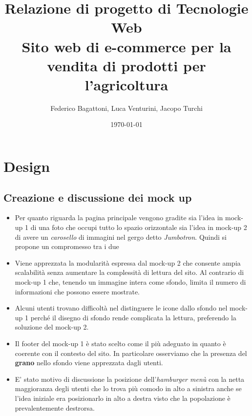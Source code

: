 \documentclass{report}
\title{
    Relazione di progetto di Tecnologie Web\\
    \large Sito web di e-commerce per la vendita di prodotti per l'agricoltura
}
\author{Federico Bagattoni, Luca Venturini, Jacopo Turchi}
\date{\today}
\begin{document}
\maketitle

\tableofcontents

\chapter{Design}

\section{Creazione e discussione dei mock up}
\begin{itemize}
    \item {Per quanto riguarda la pagina principale vengono gradite sia l'idea in mock-up 1 di una foto che occupi tutto lo spazio orizzontale sia l'idea in mock-up 2 di avere un \textit{carosello} di immagini nel gergo detto \textit{Jumbotron}. Quindi si propone un compromesso tra i due}
    \item {Viene apprezzata la modularità espressa dal mock-up 2 che consente ampia scalabilità senza aumentare la complessità di lettura del sito. Al contrario di mock-up 1 che, tenendo un immagine intera come sfondo, limita il numero di informazioni che possono essere mostrate.}
    \item {Alcuni utenti trovano difficoltà nel distinguere le icone dallo sfondo nel mock-up 1 perché il disegno di sfondo rende complicata la lettura, preferendo la soluzione del mock-up 2.}
    \item {Il footer del mock-up 1 è stato scelto come il più adeguato in quanto è coerente con il contesto del sito. In particolare osserviamo che la presenza del \textbf{grano} nello sfondo viene apprezzata dagli utenti.}
    \item {E' stato motivo di discussione la posizione dell'\textit{hamburger menù} con la netta maggioranza degli utenti che lo trova più comodo in alto a sinistra anche se l'idea iniziale era posizionarlo in alto a destra visto che la popolazione è prevalentemente destrorsa.}
\end{itemize}
\end{document}
